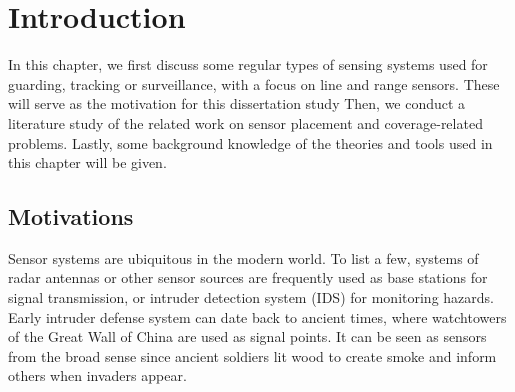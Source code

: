 
\chapter{Introduction} 
\thispagestyle{myheadings} 
In this chapter, we first discuss some regular types of sensing systems 
used for guarding, tracking or surveillance, 
with a focus on line and range sensors. 
These will serve as the motivation for this dissertation study
Then, we conduct a literature study of the related work on sensor placement and 
coverage-related problems. 
Lastly, some background knowledge of the theories and tools used in this chapter will be given. 

\section{Motivations} 
Sensor systems are ubiquitous in the modern world. 
To list a few, systems of radar antennas 
or other sensor sources are frequently used as base stations for signal transmission, 
or intruder detection system (IDS) for monitoring hazards. 
Early intruder defense system can date back to ancient times, where 
watchtowers of the Great Wall of China are used as signal points. 
It can be seen as sensors from the broad sense 
since ancient soldiers lit wood to create smoke and inform others when invaders appear. 
